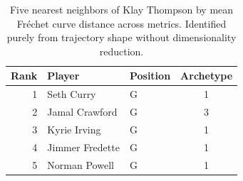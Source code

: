 \begin{table}[htbp]
  \centering\small
  \begin{tabular}{rllc}
    \toprule
    Rank & Player & Position & Archetype \\
    \midrule
    1 & Seth Curry & G & 1 \\
    2 & Jamal Crawford & G & 3 \\
    3 & Kyrie Irving & G & 1 \\
    4 & Jimmer Fredette & G & 1 \\
    5 & Norman Powell & G & 1 \\
    \bottomrule
  \end{tabular}
  \caption{Five nearest neighbors of Klay Thompson by mean Fr\'{e}chet curve distance across metrics. Identified purely from trajectory shape without dimensionality reduction.}
  \label{tab:Klay_Thompson_frechet_curve_neighbors}
\end{table}

